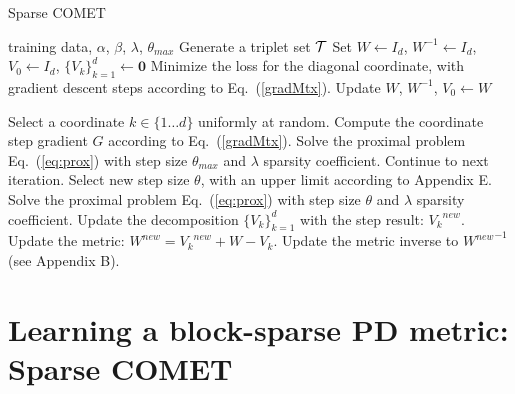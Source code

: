 \documentclass[twoside,11pt]{article}
\newcommand\mat[1]{{#1}}
\renewcommand\vec[1]{\mathbf{#1}}
\newcommand{\W}{\mat{W}}
\newcommand{\newW}{{\mat{W^{new}}}}
\newcommand{\ignore}[1]{}
\newcommand{\Vk}{\mat{V_k}}
\newcommand{\Vz}{\mat{V_0}}
\newcommand{\Vgrc}{\{\Vk\}_{k=1}^{d}} %
\newcommand{\cholL}{\mat{L}}
\renewcommand{\eqref}[1]{Eq.~(\ref{#1})}
\begin{document}
\begin{algorithm}[t]
   \caption{Sparse COMET}
   \label{alg:spcomet}
\begin{algorithmic}[1]
    training data, $\alpha$, $\beta$, $\lambda$, $\theta_{max}$
   \STATE Generate a triplet set $\cal{T}$
   \STATE Set  $\W  \leftarrow I_d$, $\W^{-1}  \leftarrow I_d$, $\Vz   \leftarrow I_d$, $\Vgrc \leftarrow \vec{0}$
   \STATE Minimize the loss for the diagonal coordinate, with gradient descent steps according to  \eqref{gradMtx}.
   \STATE Update $\W$, $\W^{-1}$, $\Vz \leftarrow \W$
    
   \REPEAT 
   \STATE Select a coordinate $k \in \{1 \ldots d\}$ uniformly at random.
   \STATE Compute the coordinate step gradient $\mat{G}$ according to \eqref{gradMtx}.
   \STATE Solve the proximal problem \eqref{eq:prox} with step size $\theta_{max}$ and $\lambda$ sparsity coefficient.
     \STATE Continue to next iteration.
   \ELSE 
      \STATE Select new step size $\theta$, with an upper limit according to Appendix E.
       \STATE Solve the proximal problem \eqref{eq:prox} with step size $\theta$ and $\lambda$ sparsity coefficient.
      \STATE Update the decomposition $\Vgrc$ with the step result: $\Vk^{new}$.
      \STATE Update the metric: $\newW = \Vk^{new} + \W - \Vk$.
       \STATE Update the metric inverse to $\newW^{-1}$ (see Appendix B).
    \ENDIF
\end{algorithmic}
\end{algorithm}

\section{Learning a block-sparse PD metric: Sparse COMET}
\ignore{The PD metric learned above can be used for extracting new features, but one is often interested to maintain interpretability with \emph{feature selection}: learn a metric which only relies on a small subset of the original feature set, or a small subset of feature pairs. To that end, we develop a method for learning feature-sparse PD metrics, using a block-coordinate descent method that maintains the PD property during training.}

\ignore{
The PD metric learned above does not take into account possible structures often found in feature interactions. }
\end{document}
